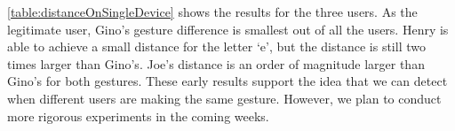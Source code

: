 \autoref{table:distanceOnSingleDevice} shows the results for the three users. As the legitimate user, Gino's gesture difference is smallest out of all the users. Henry is able to achieve a small distance for the letter `e', but the distance is still two times larger than Gino's. Joe's distance is an order of magnitude larger than Gino's for both gestures. These early results support the idea that we can detect when different users are making the same gesture. However, we plan to conduct more rigorous experiments in the coming weeks.


 

